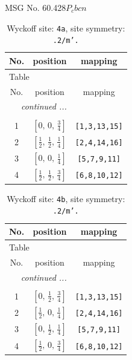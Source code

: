 \documentclass[fleqn,8pt]{jsarticle}
\begin{document}
\setcounter{MaxMatrixCols}{32}

\renewcommand{\tablename}{Table~}
\renewcommand{\figurename}{Figure~}
\begin{center}
\LARGE
MSG No. 60.428\quad$P_{c}bcn$
\end{center}
\renewcommand{\arraystretch}{1.2}
\begin{longtable}{ccc}
\caption{Wyckoff site: {\tt 4a}, site symmetry: {\tt .2/m'.}}
 \\
 \hline \hline
No. & position & mapping \\ \hline \endfirsthead

\multicolumn{2}{l}{\tablename\ \thetable{}} \\
 \hline \hline
No. & position & mapping \\ \hline \endhead

 \hline \hline
\multicolumn{2}{r}{\footnotesize\it continued ...} \\ \endfoot

 \hline \hline
\multicolumn{2}{r}{} \\ \endlastfoot

1 & $\left[ 0,\, 0,\, \frac{3}{4} \right]$ & {\tt [1,3,13,15]} \\ \hline
2 & $\left[ \frac{1}{2},\, \frac{1}{2},\, \frac{1}{4} \right]$ & {\tt [2,4,14,16]} \\ \hline
3 & $\left[ 0,\, 0,\, \frac{1}{4} \right]$ & {\tt [5,7,9,11]} \\ \hline
4 & $\left[ \frac{1}{2},\, \frac{1}{2},\, \frac{3}{4} \right]$ & {\tt [6,8,10,12]} \\
\end{longtable}
\renewcommand{\arraystretch}{1.2}
\begin{longtable}{ccc}
\caption{Wyckoff site: {\tt 4b}, site symmetry: {\tt .2/m'.}}
 \\
 \hline \hline
No. & position & mapping \\ \hline \endfirsthead

\multicolumn{2}{l}{\tablename\ \thetable{}} \\
 \hline \hline
No. & position & mapping \\ \hline \endhead

 \hline \hline
\multicolumn{2}{r}{\footnotesize\it continued ...} \\ \endfoot

 \hline \hline
\multicolumn{2}{r}{} \\ \endlastfoot

1 & $\left[ 0,\, \frac{1}{2},\, \frac{3}{4} \right]$ & {\tt [1,3,13,15]} \\ \hline
2 & $\left[ \frac{1}{2},\, 0,\, \frac{1}{4} \right]$ & {\tt [2,4,14,16]} \\ \hline
3 & $\left[ 0,\, \frac{1}{2},\, \frac{1}{4} \right]$ & {\tt [5,7,9,11]} \\ \hline
4 & $\left[ \frac{1}{2},\, 0,\, \frac{3}{4} \right]$ & {\tt [6,8,10,12]} \\
\end{longtable}
\end{document}
